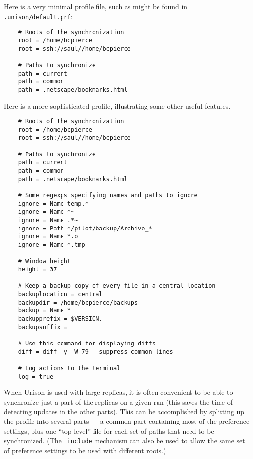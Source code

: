 \documentclass{article}
\begin{document}


Here is a very minimal profile file, such as might be found in {\tt
  .unison/default.prf}:
\begin{verbatim}
    # Roots of the synchronization
    root = /home/bcpierce
    root = ssh://saul//home/bcpierce

    # Paths to synchronize 
    path = current
    path = common
    path = .netscape/bookmarks.html
\end{verbatim}


Here is a more sophisticated profile, illustrating some other useful
features. 
\begin{verbatim}
    # Roots of the synchronization
    root = /home/bcpierce
    root = ssh://saul//home/bcpierce

    # Paths to synchronize 
    path = current
    path = common
    path = .netscape/bookmarks.html

    # Some regexps specifying names and paths to ignore
    ignore = Name temp.*
    ignore = Name *~
    ignore = Name .*~
    ignore = Path */pilot/backup/Archive_*
    ignore = Name *.o
    ignore = Name *.tmp

    # Window height
    height = 37

    # Keep a backup copy of every file in a central location
    backuplocation = central
    backupdir = /home/bcpierce/backups
    backup = Name *
    backupprefix = $VERSION.
    backupsuffix = 

    # Use this command for displaying diffs
    diff = diff -y -W 79 --suppress-common-lines

    # Log actions to the terminal
    log = true
\end{verbatim}


When Unison is used with large replicas, it is often convenient to be
able to synchronize just a part of the replicas on a given run (this
saves the time of detecting updates in the other parts).  This can be
accomplished by splitting up the profile into several parts --- a common
part containing most of the preference settings, plus one ``top-level''
file for each set of paths that need to be synchronized.  (The {\tt
  include} mechanism can also be used to allow the same set of preference
settings to be used with different roots.)
\end{document}
